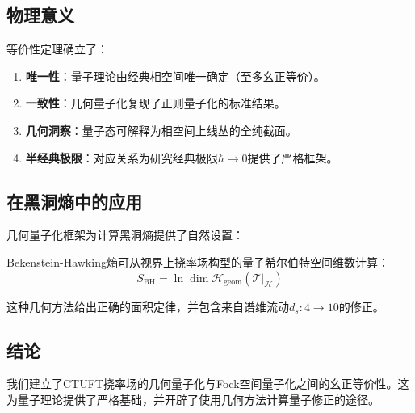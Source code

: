 \subsection{物理意义}

等价性定理确立了：

\begin{enumerate}
    \item \textbf{唯一性}：量子理论由经典相空间唯一确定（至多幺正等价）。
    
    \item \textbf{一致性}：几何量子化复现了正则量子化的标准结果。
    
    \item \textbf{几何洞察}：量子态可解释为相空间上线丛的全纯截面。
    
    \item \textbf{半经典极限}：对应关系为研究经典极限$\hbar \to 0$提供了严格框架。
\end{enumerate}

\subsection{在黑洞熵中的应用}

几何量子化框架为计算黑洞熵提供了自然设置：

\begin{theorem}[几何熵]
Bekenstein-Hawking熵可从视界上挠率场构型的量子希尔伯特空间维数计算：
\begin{equation}
    S_{\text{BH}} = \ln \dim \mathcal{H}_{\text{geom}}(\mathcal{T}|_{\mathcal{H}})
\end{equation}
\end{theorem}

这种几何方法给出正确的面积定律，并包含来自谱维流动$d_s : 4 \to 10$的修正。

\subsection{结论}

我们建立了CTUFT挠率场的几何量子化与Fock空间量子化之间的幺正等价性。这为量子理论提供了严格基础，并开辟了使用几何方法计算量子修正的途径。
